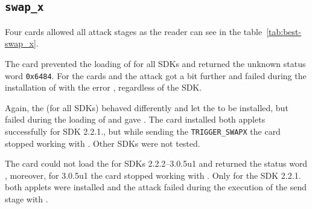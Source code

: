




        \subsection{\texttt{swap_x}}\label{subsec:swapx}

            Four cards allowed all attack stages as the reader can see in the table~\ref{tab:best-swap_x}.

            The card \Gcard prevented the loading of \vulnscap for all SDKs and returned the unknown status word \texttt{0x6484}. For the cards \Ccard and \Icard the attack got a bit further and failed during the installation of \vulnscap with the error \shortswconditionsnotsatisfied, regardless of the SDK.

            Again, the \Cnewcard (for all SDKs) behaved differently and let the \vulnscap to be installed, but failed during the loading of \appletscap and gave \shortswconditionsnotsatisfied. The card \Acard installed both applets successfully for SDK 2.2.1., but while sending the \texttt{TRIGGER_SWAPX} the card stopped working with \scardwunpoweredcard. Other SDKs were not tested.

        The card \Dcard could not load the \appletscap for SDKs 2.2.2--3.0.5u1 and returned the status word \shortswwrongdata, moreover, for 3.0.5u1 the card stopped working with \scardenottransacted. Only for the SDK 2.2.1. both applets were installed and the attack failed during the execution of the send stage with \shortswclanotsupported.


